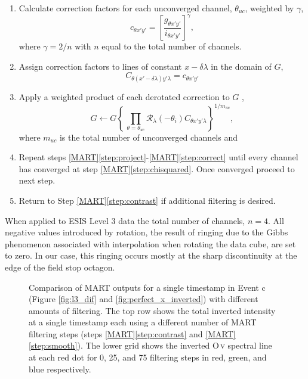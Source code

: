 \begin{enumerate}
		\item Calculate correction factors for each unconverged channel, $\theta_{uc}$, weighted by $\gamma$, 
			\begin{equation} \label{eq:correctionfactor}
				c_{\theta x'y'} = \left[\frac{g_{\theta x'y'}}{i_{\theta x'y'}}\right]^\gamma,
			\end{equation}
		where $\gamma = 2/n$ with $n$ equal to the total number of channels.
		
		\item Assign correction factors to lines of constant $x-\delta\lambda$ in the domain of $G$,
			\begin{equation}
				C_{\theta (x'-\delta\lambda)y'\lambda} = c_{\theta x'y'}
			\end{equation}	
		
		\item \label{step:correct} Apply a weighted product of each derotated correction to $G$ ,
			\begin{equation}\label{eq:correct}
				G \leftarrow G\left\lbrace  \,\prod_{\theta=\theta_{uc}}  \mathcal{R}_\lambda(-\theta_i)C_{\theta x'y'\lambda} \right\rbrace^{1/m_{uc}},
			\end{equation}
		where $m_{uc}$ is the total number of unconverged channels and 
		
		\item Repeat steps \ref{MART}\ref{step:project}-\ref{MART}\ref{step:correct}
		until every channel has converged at step \ref{MART}\ref{step:chisquared}. Once converged proceed to next step.
		\item Return to Step \ref{MART}\ref{step:contrast} if additional filtering is desired.
	\end{enumerate}
	When applied to  ESIS Level 3 data the total number of channels, $n = 4$.
	All negative values introduced by rotation, the result of ringing due to the Gibbs phenomenon associated with interpolation when rotating the data cube, are set to zero.
	In our case, this ringing occurs mostly at the sharp discontinuity at the edge of the field stop octagon. 
	
	\begin{figure}[htb!]
		\centering
		\caption{Comparison of MART outputs for a single timestamp in Event c (Figure \ref{fig:l3_dif} and \ref{fig:perfect_x_inverted}) with different amounts of filtering. 
		The top row shows the total inverted intensity at a single timestamp each using a different number of MART filtering steps (steps \ref{MART}\ref{step:contrast} and \ref{MART}\ref{step:smooth}).  
		The lower grid shows the inverted O\,\textsc{v} spectral line at each red dot for 0, 25, and 75 filtering steps in red, green, and blue respectively.}
		\label{fig:perfect_x_invertcomp}
	\end{figure}
	
